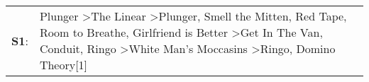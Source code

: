 \begin{supertabular}{p{0.03\textwidth}p{0.92\textwidth}}
 \textbf{S1}:  &  Plunger\textsuperscript{} \textgreater \enspace The Linear\textsuperscript{} \textgreater \enspace Plunger\textsuperscript{}, \enspace Smell the Mitten\textsuperscript{}, \enspace Red Tape\textsuperscript{}, \enspace Room to Breathe\textsuperscript{}, \enspace Girlfriend is Better\textsuperscript{} \textgreater \enspace Get In The Van\textsuperscript{}, \enspace Conduit\textsuperscript{}, \enspace Ringo\textsuperscript{} \textgreater \enspace White Man's Moccasins\textsuperscript{} \textgreater \enspace Ringo\textsuperscript{}, \enspace Domino Theory[1]\textsuperscript{}  \enspace  \\
\end{supertabular}
